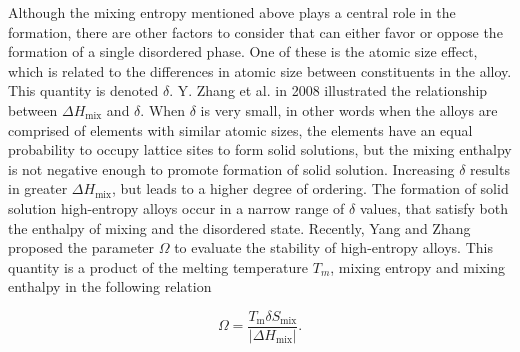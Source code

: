 Although the mixing entropy mentioned above plays a central role in the formation, there are other factors to consider that can either favor or oppose the formation of a single disordered phase. One of these is the atomic size effect, which is related to the differences in atomic size between constituents in the alloy. This quantity is denoted $\delta$. Y. Zhang et al. in 2008 illustrated the relationship between $\Delta H_\text{mix}$ and $\delta$. When $\delta$ is very small, in other words when the alloys are comprised of elements with similar atomic sizes, the elements have an equal probability to occupy lattice sites to form solid solutions, but the mixing enthalpy is not negative enough to promote formation of solid solution. Increasing $\delta$ results in greater $\Delta H_\text{mix}$, but leads to a higher degree of ordering. The formation of solid solution high-entropy alloys occur in a narrow range of $\delta$ values, that satisfy both the enthalpy of mixing and the disordered state. Recently, Yang and Zhang proposed the parameter $\Omega$ to evaluate the stability of high-entropy alloys. This quantity is a product of the melting temperature $T_m$, mixing entropy and mixing enthalpy in the following relation

\begin{equation}
\Omega = \frac{T_\text{m} \delta S_\text{mix}}{|\Delta H_\text{mix}|}.
\end{equation}


